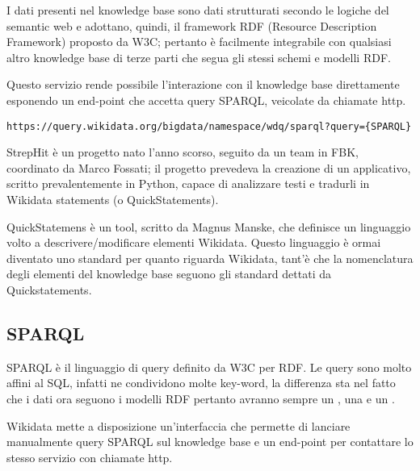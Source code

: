 I dati presenti nel knowledge base sono dati strutturati secondo le logiche del semantic web e adottano, quindi, il framework RDF (Resource Description Framework) proposto da W3C; 
pertanto è facilmente integrabile con qualsiasi altro knowledge base di terze parti che segua gli stessi schemi e modelli RDF.

Questo servizio rende possibile l'interazione con il knowledge base direttamente esponendo un end-point che accetta query SPARQL, veicolate da chiamate http. 

\begin{lstlisting}[style=YmlStyle, caption=SPARQL end-point]
    https://query.wikidata.org/bigdata/namespace/wdq/sparql?query={SPARQL}
\end{lstlisting}

StrepHit\cite{strephit} è un progetto nato l'anno scorso, seguito da un team in FBK, coordinato da Marco Fossati; il progetto prevedeva la creazione di un applicativo, scritto prevalentemente 
in Python, capace di analizzare testi e tradurli in Wikidata statements (o QuickStatements\cite{quickstatements}).  

QuickStatemens è un tool, scritto da Magnus Manske, che definisce un linguaggio volto a descrivere/modificare elementi Wikidata. Questo linguaggio è ormai diventato uno standard 
per quanto riguarda Wikidata, tant'è che la nomenclatura degli elementi del knowledge base seguono gli standard dettati da Quickstatements.

\subsection{SPARQL}
SPARQL è il linguaggio di query definito da W3C per RDF. Le query sono molto affini al SQL, infatti ne condividono molte key-word, la differenza sta nel fatto che i dati ora 
seguono i modelli RDF pertanto avranno sempre un , una  e un .

Wikidata mette a disposizione un'interfaccia\cite{sparql-ui} che permette di lanciare manualmente query SPARQL sul knowledge base
e un end-point\cite{sparql-end-point} per contattare lo stesso servizio con chiamate http. 
